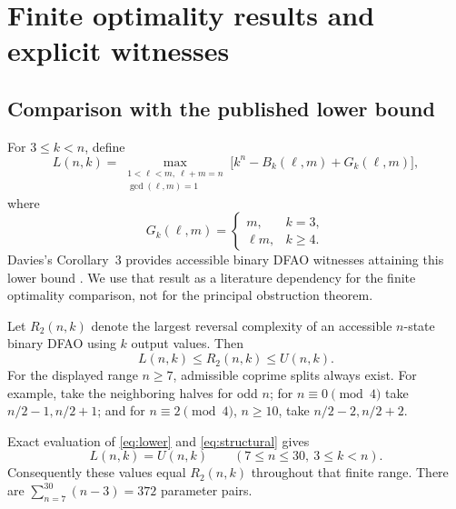 \documentclass[11pt,a4paper]{article}
\numberwithin{equation}{section}
\theoremstyle{definition}
\theoremstyle{remark}
\begin{document}
\section{Finite optimality results and explicit witnesses}\label{sec:finite}

\subsection{Comparison with the published lower bound}

For $3\le k<n$, define
\begin{equation}\label{eq:lower}
 L(n,k)=\max_{\substack{1<\ell<m,\ \ell+m=n\\\gcd(\ell,m)=1}}
 \bigl[k^n-B_k(\ell,m)+G_k(\ell,m)\bigr],
\end{equation}
where
\[
 G_k(\ell,m)=
 \begin{cases}
 m,&k=3,\\
 \ell m,&k\ge4.
 \end{cases}
\]
Davies's Corollary~3 provides accessible binary DFAO witnesses attaining
this lower bound \cite{Davies2017}. We use that result as a literature
dependency for the finite optimality comparison, not for the principal
obstruction theorem.

Let $R_2(n,k)$ denote the largest reversal complexity of an accessible
$n$-state binary DFAO using $k$ output values. Then
\[
 L(n,k)\le R_2(n,k)\le U(n,k).
\]
For the displayed range $n\ge7$, admissible coprime splits always exist.
For example, take the neighboring halves for odd $n$; for $n\equiv0\pmod4$
take $n/2-1,n/2+1$; and for $n\equiv2\pmod4$, $n\ge10$, take
$n/2-2,n/2+2$.

\begin{proposition}\label{prop:finite}
Exact evaluation of \eqref{eq:lower} and \eqref{eq:structural} gives
\[
 L(n,k)=U(n,k)
 \qquad(7\le n\le30,\ 3\le k<n).
\]
Consequently these values equal $R_2(n,k)$ throughout that finite range.
There are $\sum_{n=7}^{30}(n-3)=372$ parameter pairs.
\end{proposition}
\noindent[Added 28 September 2026, batch 39: for $k=3$ the equality
$L(n,3)=U(n,3)=R_2(n,3)$ holds for every $n\ge7$
(\cref{tor:thm:main,tor:rem:UL}), and the splits listed above are the optimal
ones (\cref{tor:lem:optimize}). Part~II's closed form reproduces all $24$ rows
$k=3$ of the table described next (\cref{tor:sec:rowcheck}).]
\noindent[Added 29 September 2026, batches 40--41: for $4\le k\le7$ the equality
$L(n,k)=U(n,k)=R_2(n,k)$ holds for every $n\ge\max(7,k+1)$, and for every
$k\ge4$ once $n\ge N(k)\le3k^4$ (\cref{evo:thm:main,evo:rem:UL}); Part~III's
finite certificates extend the equality $R_2(n,k)=L(n,k)$ to $7\le n\le100$,
$3\le k\le\min(12,n-1)$ (\cref{evo:et:prop:finite}). All $372$ rows of the
table described next agree with Part~III's formula
(\cref{evo:sec:rowcheck}).]
\end{document}
